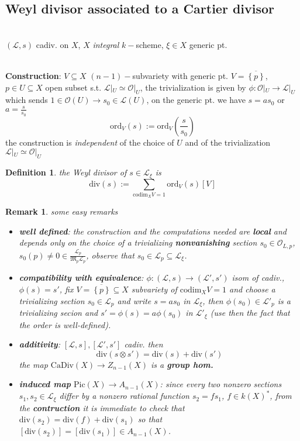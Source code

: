 \documentclass[oneside,a4paper,11pt]{amsbook}
\theoremstyle{pl}
\theoremstyle{df}
\newtheorem*{dfn}{Definition}
\theoremstyle{rm}
\newtheorem{rmk}{Remark}[chapter]
\newcommand{\nline}{
~\\
}%
\newcommand{\pa}[1]{
\left(#1\right)
}
\newcommand{\qa}[1]{
\left[#1\right]
}
\newcommand{\ga}[1]{
\left\{#1\right\}
}
\newcommand{\ol}[1]{
\overline{#1}
}
\newcommand{\mc}[1]{
\mathcal{#1}
}
\newcommand{\mf}[1]{
\mathfrak{#1}
}
\newcommand{\ord}[2]{
\text{ord}_{#1}\pa{#2}
}
\newcommand{\dv}[1]{
\text{div}\pa{#1}
}
\newcommand{\cod}[2]{
\text{codim}_{#1}{#2}
}
\begin{document}
\subsection{Weyl divisor associated to a Cartier divisor}
\nline
$\pa{\mc{L},s}$ cadiv. on $X$, $X$ \emph{integral} $k-$scheme, $\xi\in X$ generic pt.
\nline
\textbf{Construction}: $V\subseteq X$ $(n-1)-$subvariety with generic pt. $V=\ol{\ga{p}}$, $p\in U\subseteq X$ open subset s.t. $\mc{L}|_U\simeq\mc{O}|_U$, the trivialization is given by $\phi:\mc{O}|_U\rightarrow\mc{L}|_U$ which sends $1\in\mc{O}(U)\rightarrow s_0\in\mc{L}(U)$, on the generic pt. we have $s=as_0$ or $a=\frac{s}{s_0}$
\[
\ord{V}{s}:=\ord{V}{\frac{s}{s_0}}
\] 
the construction is \emph{independent} of the choice of $U$ and of the trivialization $\mc{L}|_U\simeq\mc{O}|_U$

\begin{dfn}
the \emph{Weyl divisor} of $s\in\mc{L}_\xi$ is
\[
\dv{s}:=\sum_{\cod{X}{V}=1}{\ord{V}{s}[V]}
\]
\end{dfn}

\begin{rmk}
some easy remarks
\begin{itemize}
\item{\textbf{well defined}: the construction and the computations needed are \textbf{local} and depends only on the choice of a trivializing \textbf{nonvanishing} section $s_0\in\mc{O}_{L,p}$, $s_0(p)\neq 0\in\frac{\mc{L}_p}{\mf{M}_p\mc{L}_p}$, observe that $s_0\in\mc{L}_p\subseteq\mc{L}_\xi$.}
\item{\textbf{compatibility with equivalence}: $\phi:\pa{\mc{L},s}\rightarrow\pa{\mc{L}',s'}$ isom of cadiv., $\phi(s)=s'$, fix $V=\ol{\ga{p}}\subseteq X$ subvariety of $\cod{X}{V}=1$ and choose a trivializing section $s_0\in\mc{L}_p$ and write $s=as_0$ in $\mc{L}_\xi$, then $\phi(s_0)\in\mc{L}'_p$ is a trivializing secion and $s'=\phi(s)=a\phi(s_0)$ in $\mc{L}'_\xi$ (use then the fact that the order is well-defined).} 
\item{\textbf{additivity}: $\qa{\mc{L},s},\qa{\mc{L}',s'}$ cadiv. then 
\[
\dv{s\otimes s'}=\dv{s}+\dv{s'}
\]
the map $\text{CaDiv}(X)\rightarrow Z_{n-1}(X)$ is a \textbf{group hom.}}
\item{\textbf{induced map} $\text{Pic}(X)\rightarrow A_{n-1}(X)$: since every two nonzero sections $s_1,s_2\in\mc{L}_\xi$ differ by a nonzero rational function $s_2=fs_1$, $f\in k(X)^*$, from the \textbf{contruction} it is immediate to check that $\dv{s_2}=\dv{f}+\dv{s_1}$ so that $\qa{\dv{s_2}}=\qa{\dv{s_1}}\in A_{n-1}(X)$.}
\end{itemize}
\end{rmk}
\end{document}
